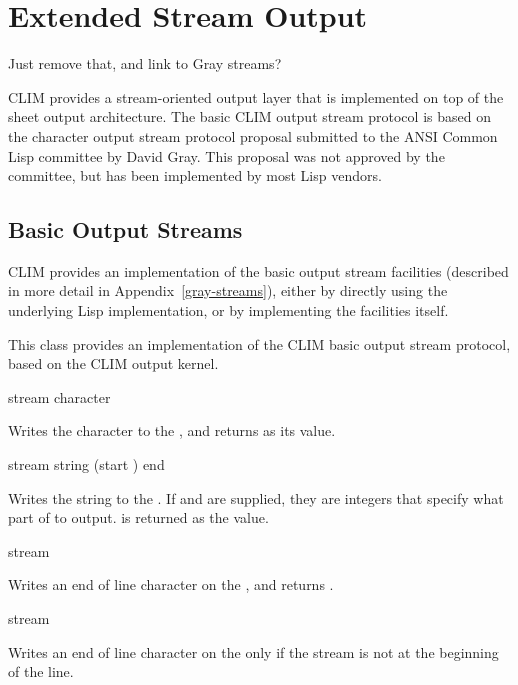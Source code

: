 
\chapter {Extended Stream Output}
\label {extended-output}

 {Just remove that, and link to Gray streams?}

CLIM provides a stream-oriented output layer that is implemented on top of the
sheet output architecture.  The basic CLIM output stream protocol is based on
the character output stream protocol proposal submitted to the ANSI Common Lisp
committee by David Gray.  This proposal was not approved by the committee, but
has been implemented by most Lisp vendors.

\section {Basic Output Streams}

CLIM provides an implementation of the basic output stream facilities (described
in more detail in Appendix~\ref{gray-streams}), either by directly using the
underlying Lisp implementation, or by implementing the facilities itself.


This class provides an implementation of the CLIM basic output stream protocol,
based on the CLIM output kernel.
\Mutable

 {stream character}

Writes the character  to the  ,
and returns  as its value.

 {stream string \optional (start ) end}

Writes the string  to the  .  If
 and  are supplied, they are integers that specify what part
of  to output.   is returned as the value.

 {stream}

Writes an end of line character on the  , and
returns .

 {stream}

Writes an end of line character on the   only if
the stream is not at the beginning of the line.

